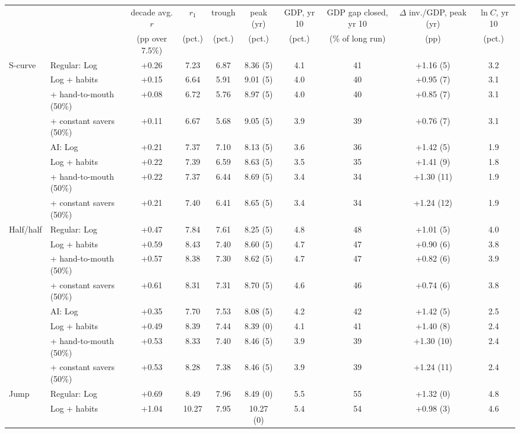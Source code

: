\begin{tabular}{llcccccccc}\toprule
 & & decade avg. $r$ & $r_1$ & trough & peak (yr) & GDP, yr 10 & GDP gap closed, yr 10 & $\Delta$ inv./GDP, peak (yr) & $\ln C$, yr 10\\
 & & (pp over 7.5\%) & (pct.) & (pct.) & (pct.) & (pct.) & (\% of long run) & (pp) & (pct.)\\\midrule
S-curve & Regular: Log & +0.26 & 7.23 & 6.87 & 8.36 (5) & 4.1 & 41 & +1.16 (5) & 3.2\\
 & Log + habits & +0.15 & 6.64 & 5.91 & 9.01 (5) & 4.0 & 40 & +0.95 (7) & 3.1\\
 & + hand-to-mouth (50\%) & +0.08 & 6.72 & 5.76 & 8.97 (5) & 4.0 & 40 & +0.85 (7) & 3.1\\
 & + constant savers (50\%) & +0.11 & 6.67 & 5.68 & 9.05 (5) & 3.9 & 39 & +0.76 (7) & 3.1\\
\midrule
 & AI: Log & +0.21 & 7.37 & 7.10 & 8.13 (5) & 3.6 & 36 & +1.42 (5) & 1.9\\
 & Log + habits & +0.22 & 7.39 & 6.59 & 8.63 (5) & 3.5 & 35 & +1.41 (9) & 1.8\\
 & + hand-to-mouth (50\%) & +0.22 & 7.37 & 6.44 & 8.69 (5) & 3.4 & 34 & +1.30 (11) & 1.9\\
 & + constant savers (50\%) & +0.21 & 7.40 & 6.41 & 8.65 (5) & 3.4 & 34 & +1.24 (12) & 1.9\\
\midrule
Half/half & Regular: Log & +0.47 & 7.84 & 7.61 & 8.25 (5) & 4.8 & 48 & +1.01 (5) & 4.0\\
 & Log + habits & +0.59 & 8.43 & 7.40 & 8.60 (5) & 4.7 & 47 & +0.90 (6) & 3.8\\
 & + hand-to-mouth (50\%) & +0.57 & 8.38 & 7.30 & 8.62 (5) & 4.7 & 47 & +0.82 (6) & 3.9\\
 & + constant savers (50\%) & +0.61 & 8.31 & 7.31 & 8.70 (5) & 4.6 & 46 & +0.74 (6) & 3.8\\
\midrule
 & AI: Log & +0.35 & 7.70 & 7.53 & 8.08 (5) & 4.2 & 42 & +1.42 (5) & 2.5\\
 & Log + habits & +0.49 & 8.39 & 7.44 & 8.39 (0) & 4.1 & 41 & +1.40 (8) & 2.4\\
 & + hand-to-mouth (50\%) & +0.53 & 8.33 & 7.40 & 8.46 (5) & 3.9 & 39 & +1.30 (10) & 2.4\\
 & + constant savers (50\%) & +0.53 & 8.28 & 7.38 & 8.46 (5) & 3.9 & 39 & +1.24 (11) & 2.4\\
\midrule
Jump & Regular: Log & +0.69 & 8.49 & 7.96 & 8.49 (0) & 5.5 & 55 & +1.32 (0) & 4.8\\
 & Log + habits & +1.04 & 10.27 & 7.95 & 10.27 (0) & 5.4 & 54 & +0.98 (3) & 4.6\\

\end{tabular}

